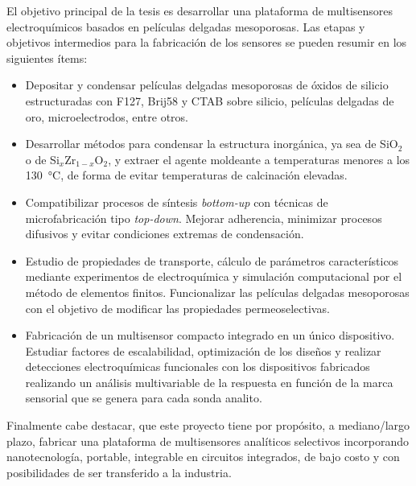 	El objetivo principal de la tesis es desarrollar una plataforma de multisensores electroquímicos basados en películas delgadas mesoporosas. Las etapas y objetivos intermedios para la fabricación de los sensores se pueden resumir en los siguientes ítems:

	\begin{itemize}
		
		\item Depositar y condensar películas delgadas mesoporosas de óxidos de silicio estructuradas con F127, Brij58 y CTAB sobre silicio, películas delgadas de oro, microelectrodos, entre otros.  
		
		\item Desarrollar métodos para condensar la estructura inorgánica, ya sea de SiO$_2$ o de Si$_{x}$Zr$_{1-x}$O$_2$, y extraer el agente moldeante a temperaturas menores a los \SI{130}{\celsius}, de forma de evitar temperaturas de calcinación elevadas.

		\item Compatibilizar procesos de síntesis \textit{bottom-up} con técnicas de microfabricación tipo \textit{top-down}. Mejorar adherencia, minimizar procesos difusivos y evitar condiciones extremas de condensación.

		\item Estudio de propiedades de transporte, cálculo de parámetros característicos mediante experimentos de electroquímica y simulación computacional por el método de elementos finitos. Funcionalizar las películas delgadas mesoporosas con el objetivo de modificar las propiedades permeoselectivas.

		\item Fabricación de un multisensor compacto integrado en un único dispositivo. Estudiar factores de escalabilidad, optimización de los diseños y realizar detecciones electroquímicas funcionales con los dispositivos fabricados realizando un análisis multivariable de la respuesta en función de la marca sensorial que se genera para cada sonda analito.

		\end{itemize}	

	Finalmente cabe destacar, que este proyecto tiene por propósito, a mediano/largo plazo, fabricar una plataforma de multisensores analíticos selectivos incorporando nanotecnología, portable, integrable en circuitos integrados, de bajo costo y con posibilidades de ser transferido a la industria.